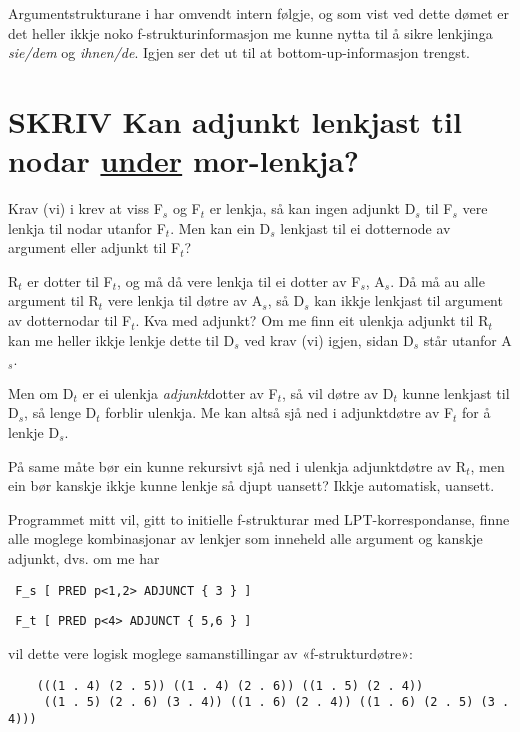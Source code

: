 \documentclass[11pt,a4paper,oneside,draft]{book}
\begin{document}
Argumentstrukturane i \Last har omvendt intern følgje, og som vist ved
dette dømet er det heller ikkje noko f-strukturinformasjon me kunne
nytta til å sikre lenkjinga \emph{sie/dem} og \emph{ihnen/de}. Igjen ser det ut
til at bottom-up-informasjon trengst.



\section{\textbf{SKRIV} Kan adjunkt lenkjast til nodar \underline{under} mor-lenkja?}
\label{sec-3.8}

\label{SEC:merge-daughters}

Krav (vi) i \citet[s.~75]{dyvik2009lmp} krev at viss F$_s$ og F$_t$ er
lenkja, så kan ingen adjunkt D$_s$ til F$_s$ vere lenkja til nodar utanfor
F$_t$. Men kan ein D$_s$ lenkjast til ei dotternode av argument eller
adjunkt til F$_t$?

R$_t$ er dotter til F$_t$, og må då vere lenkja til ei dotter av F$_s$,
A$_s$. Då må au alle argument til R$_t$ vere lenkja til døtre av A$_s$, så
D$_s$ kan ikkje lenkjast til argument av dotternodar til F$_t$. Kva med
adjunkt? Om me finn eit ulenkja adjunkt til R$_t$ kan me heller ikkje
lenkje dette til D$_s$ ved krav (vi) igjen, sidan D$_s$ står utanfor
A$_s$.

Men om D$_t$ er ei ulenkja \emph{adjunkt}dotter av F$_t$, så vil døtre av
D$_t$ kunne lenkjast til D$_s$, så lenge D$_t$ forblir ulenkja. Me kan altså
sjå ned i adjunktdøtre av F$_t$ for å lenkje D$_s$. 

På same måte bør ein kunne rekursivt sjå ned i ulenkja adjunktdøtre av
R$_t$, men ein bør kanskje ikkje kunne lenkje så djupt uansett? Ikkje
automatisk, uansett.



Programmet mitt vil, gitt to initielle f-strukturar med
LPT-korrespondanse, finne alle moglege kombinasjonar av lenkjer som
inneheld alle argument og kanskje adjunkt, dvs. om me har

\begin{verbatim}
 F_s [ PRED p<1,2> ADJUNCT { 3 } ]
\end{verbatim}


\begin{verbatim}
 F_t [ PRED p<4> ADJUNCT { 5,6 } ]
\end{verbatim}


vil dette vere logisk moglege samanstillingar av «f-strukturdøtre»:

\begin{verbatim}
    (((1 . 4) (2 . 5)) ((1 . 4) (2 . 6)) ((1 . 5) (2 . 4))
     ((1 . 5) (2 . 6) (3 . 4)) ((1 . 6) (2 . 4)) ((1 . 6) (2 . 5) (3 . 4)))
\end{verbatim}
\end{document}

